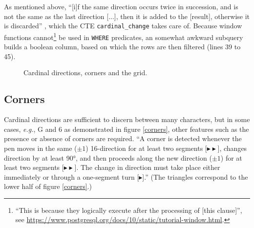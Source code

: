 \documentclass[sigconf]{acmart}
\begin{document}
As mentioned above, \enquote{[i]f the same direction occurs twice in succession, and is not the same as the last direction [...], then it is added to the [result], otherwise it is discarded} \cite{groner}, which the CTE \texttt{cardinal\_change} takes care of. Because window functions cannot\footnote{\enquote{This is because they logically execute after the processing of [this clause]}, see \url{https://www.postgresql.org/docs/10/static/tutorial-window.html}.} be used in \texttt{WHERE} predicates, an somewhat awkward subquery builds a boolean column, based on which the rows are then filtered (lines 39 to 45).

\begin{figure}[pb]
  \centering
  \hspace{0.5cm}
  \caption{Cardinal directions, corners and the grid.}
  \label{cornergrid}
\end{figure}

\subsection{Corners}

Cardinal directions are sufficient to discern between many characters, but in some cases, \textit{e.g.}, G and 6 as demonstrated in figure \ref{corners}, other features such as the presence or absence of corners are required. \enquote{A corner is detected whenever the pen moves in the same ($\pm 1$) 16-direction for at least two segments [{\color[HTML]{21C800}$\blacktriangleright\blacktriangleright$}], changes direction by at least 90°, and then proceeds along the new direction ($\pm 1$) for at least two segments [{\color[HTML]{008AFF}$\blacktriangleright\blacktriangleright$}]. The change in direction must take place either immediately or through a one-segment turn [{\color[HTML]{FFC000}$\blacktriangleright$}].} \cite{groner} (The triangles correspond to the lower half of figure \ref{corners}.)
\end{document}
